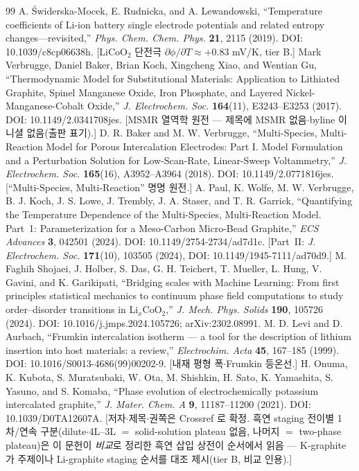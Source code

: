 \begin{thebibliography}{99}
 A. {\'S}widerska-Mocek, E. Rudnicka, and A. Lewandowski, ``Temperature coefficients of Li-ion battery single electrode potentials and related entropy changes---revisited,'' \emph{Phys. Chem. Chem. Phys.} \textbf{21}, 2115 (2019). DOI: 10.1039/c8cp06638h. [LiCoO$_2$ 단전극 $\partial\phi/\partial T\approx+0.83$ mV/K, tier B.]
 Mark Verbrugge, Daniel Baker, Brian Koch, Xingcheng Xiao, and Wentian Gu, ``Thermodynamic Model for Substitutional Materials: Application to Lithiated Graphite, Spinel Manganese Oxide, Iron Phosphate, and Layered Nickel-Manganese-Cobalt Oxide,'' \emph{J. Electrochem. Soc.} \textbf{164}(11), E3243--E3253 (2017). DOI: 10.1149/2.0341708jes. [MSMR 열역학 원전 --- 제목에 MSMR 없음$\cdot$byline 이니셜 없음(출판 표기).]
 D. R. Baker and M. W. Verbrugge, ``Multi-Species, Multi-Reaction Model for Porous Intercalation Electrodes: Part I. Model Formulation and a Perturbation Solution for Low-Scan-Rate, Linear-Sweep Voltammetry,'' \emph{J. Electrochem. Soc.} \textbf{165}(16), A3952--A3964 (2018). DOI: 10.1149/2.0771816jes. [``Multi-Species, Multi-Reaction'' 명명 원전.]
 A. Paul, K. Wolfe, M. W. Verbrugge, B. J. Koch, J. S. Lowe, J. Trembly, J. A. Staser, and T. R. Garrick, ``Quantifying the Temperature Dependence of the Multi-Species, Multi-Reaction Model. Part~1: Parameterization for a Meso-Carbon Micro-Bead Graphite,'' \emph{ECS Advances} \textbf{3}, 042501 (2024). DOI: 10.1149/2754-2734/ad7d1c. [Part~II: \emph{J. Electrochem. Soc.} \textbf{171}(10), 103505 (2024), DOI: 10.1149/1945-7111/ad70d9.]
 M. Faghih Shojaei, J. Holber, S. Das, G. H. Teichert, T. Mueller, L. Hung, V. Gavini, and K. Garikipati, ``Bridging scales with Machine Learning: From first principles statistical mechanics to continuum phase field computations to study order--disorder transitions in Li$_x$CoO$_2$,'' \emph{J. Mech. Phys. Solids} \textbf{190}, 105726 (2024). DOI: 10.1016/j.jmps.2024.105726; arXiv:2302.08991.
 M. D. Levi and D. Aurbach, ``Frumkin intercalation isotherm --- a tool for the description of lithium insertion into host materials: a review,'' \emph{Electrochim. Acta} \textbf{45}, 167--185 (1999). DOI: 10.1016/S0013-4686(99)00202-9. [내재 평형 폭$\cdot$Frumkin 등온선.]
 H. Onuma, K. Kubota, S. Muratsubaki, W. Ota, M. Shishkin, H. Sato, K. Yamashita, S. Yasuno, and S. Komaba, ``Phase evolution of electrochemically potassium intercalated graphite,'' \emph{J. Mater. Chem. A} \textbf{9}, 11187--11200 (2021). DOI: 10.1039/D0TA12607A. [저자$\cdot$제목$\cdot$권쪽은 Crossref 로 확정. 흑연 staging 전이별 1차/연속 구분(dilute$\cdot$4L--3L $=$ solid-solution plateau 없음, 나머지 $=$ two-phase plateau)은 이 문헌이 \emph{비교}로 정리한 흑연 삽입 상전이 순서에서 읽음 --- K-graphite 가 주제이나 Li-graphite staging 순서를 대조 제시(tier B, 비교 인용).]

\end{thebibliography}
